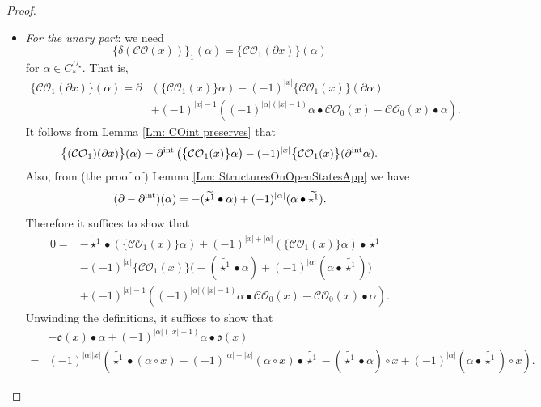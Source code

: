 \documentclass[10pt]{amsart}
\numberwithin{equation}{section}
\theoremstyle{plain}
\theoremstyle{definition}
\theoremstyle{remark}
\numberwithin{equation}{section}
\newcommand{\wt}[1]{\widetilde{#1}}
\newcommand{\CO}{\mathcal{CO}}
\newcommand{\CBa}{C_*^{\Omega_\star}}
\begin{document}
{\begin{proof}
\begin{itemize}
	\item	\emph{For the unary part}: we need \[\big\{\delta(\CO(x))\big\}_1(\alpha) = \big\{\CO_1(\partial x)\big\}(\alpha)\] for $\alpha\in \CBa$.
	That is, 
	\begin{align*}
		  \big\{ \CO_1(\partial x)\big\} (\alpha)= \partial &\left( \big\{ \CO_1(x)\big\} \alpha \right) - (-1)^{|x|} \big\{ \CO_1(x)\big\} (\partial \alpha) \\ 
		  &+ (-1)^{|x|-1} \left( (-1)^{|\alpha|(|x|-1)} \alpha\bullet \CO_0(x) - \CO_0(x)\bullet \alpha \right) .
	\end{align*}	
	It follows from Lemma \ref{Lm: COint preserves} that 
	\begin{align*}
		\big\{(\CO_1)(\partial x)\big\}(\alpha) = \partial^\textup{int} \left( \big\{\CO_1(x)\big\}\alpha\right)  -(-1)^{|x|} \big\{ \CO_1(x)\big\}(\partial^\textup{int} \alpha).
	\end{align*}
	Also, from (the proof of) Lemma \ref{Lm: StructuresOnOpenStatesApp} we have \[ (\partial - \partial^\textup{int})(\alpha) = - (\wt{\star^1}\bullet \alpha) + (-1)^{|\alpha|}(\alpha \bullet \wt{\star^1}). \] 	Therefore it suffices to show that 
	\begin{align*}
		0= &-\wt{\star^1}  \bullet \left( \big\{ \CO_1(x) \big\}\alpha \right) + (-1)^{|x|+|\alpha|} \left( \big\{ \CO_1(x) \big\}\alpha \right) \bullet  \wt{\star^1}\\
		&- (-1)^{|x|} \big\{ \CO_1(x)\big\} \big(-(\wt{\star^1}\bullet \alpha ) + (-1)^{|\alpha|} (\alpha\bullet \wt{\star^1})\big)\\
		& + (-1)^{|x|-1} \left( (-1)^{|\alpha|(|x|-1)} \alpha\bullet \CO_0(x) - \CO_0(x)\bullet \alpha \right).
	\end{align*}
	Unwinding the definitions, it suffices to show that 
	\begin{align*}
		&-\mathfrak{o}(x)\bullet \alpha + (-1)^{|\alpha|(|x|-1)} \alpha\bullet \mathfrak{o}(x) \\
		=& (-1)^{|\alpha||x|}\left( \wt{\star^1}\bullet (\alpha \circ x) -  (-1)^{|\alpha|+|x|}(\alpha\circ x) \bullet \wt{\star^1} - (\wt{\star^1}\bullet\alpha)\circ x+(-1)^{|\alpha|} (\alpha\bullet \wt{\star^1})\circ x\right).
	\end{align*}


\end{itemize}
\end{proof}}
\end{document}
